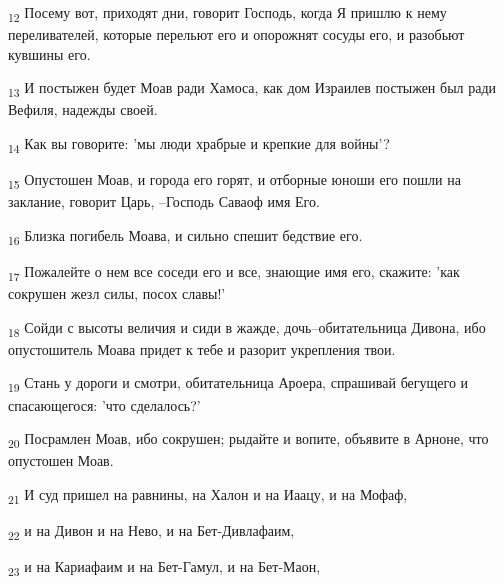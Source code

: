 \begin{tcolorbox}
\textsubscript{12} Посему вот, приходят дни, говорит Господь, когда Я пришлю к нему переливателей, которые перельют его и опорожнят сосуды его, и разобьют кувшины его.
\end{tcolorbox}
\begin{tcolorbox}
\textsubscript{13} И постыжен будет Моав ради Хамоса, как дом Израилев постыжен был ради Вефиля, надежды своей.
\end{tcolorbox}
\begin{tcolorbox}
\textsubscript{14} Как вы говорите: 'мы люди храбрые и крепкие для войны'?
\end{tcolorbox}
\begin{tcolorbox}
\textsubscript{15} Опустошен Моав, и города его горят, и отборные юноши его пошли на заклание, говорит Царь, --Господь Саваоф имя Его.
\end{tcolorbox}
\begin{tcolorbox}
\textsubscript{16} Близка погибель Моава, и сильно спешит бедствие его.
\end{tcolorbox}
\begin{tcolorbox}
\textsubscript{17} Пожалейте о нем все соседи его и все, знающие имя его, скажите: 'как сокрушен жезл силы, посох славы!'
\end{tcolorbox}
\begin{tcolorbox}
\textsubscript{18} Сойди с высоты величия и сиди в жажде, дочь--обитательница Дивона, ибо опустошитель Моава придет к тебе и разорит укрепления твои.
\end{tcolorbox}
\begin{tcolorbox}
\textsubscript{19} Стань у дороги и смотри, обитательница Ароера, спрашивай бегущего и спасающегося: 'что сделалось?'
\end{tcolorbox}
\begin{tcolorbox}
\textsubscript{20} Посрамлен Моав, ибо сокрушен; рыдайте и вопите, объявите в Арноне, что опустошен Моав.
\end{tcolorbox}
\begin{tcolorbox}
\textsubscript{21} И суд пришел на равнины, на Халон и на Иаацу, и на Мофаф,
\end{tcolorbox}
\begin{tcolorbox}
\textsubscript{22} и на Дивон и на Нево, и на Бет-Дивлафаим,
\end{tcolorbox}
\begin{tcolorbox}
\textsubscript{23} и на Кариафаим и на Бет-Гамул, и на Бет-Маон,
\end{tcolorbox}
